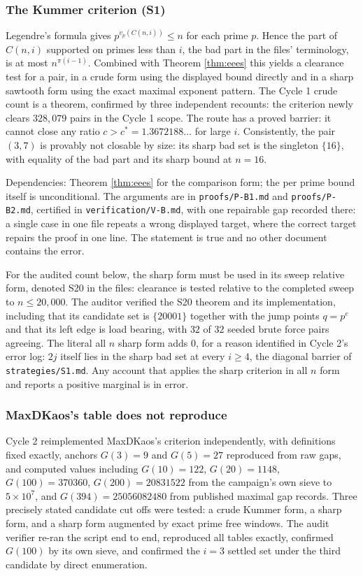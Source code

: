 \documentclass[11pt]{article}
\theoremstyle{remark}
\begin{document}
\subsubsection{The Kummer criterion (S1)}

Legendre's formula gives $p^{v_p(C(n,i))}\le n$ for each prime $p$. Hence the part of $C(n,i)$ supported on primes less than $i$, the bad part in the files' terminology, is at most $n^{\pi(i-1)}$. Combined with Theorem \ref{thm:eees} this yields a clearance test for a pair, in a crude form using the displayed bound directly and in a sharp sawtooth form using the exact maximal exponent pattern. The Cycle 1 crude count is a theorem, confirmed by three independent recounts: the criterion newly clears $328{,}079$ pairs in the Cycle 1 scope. The route has a proved barrier: it cannot close any ratio $c>c^*=1.3672188\dots$ for large $i$. Consistently, the pair $(3,7)$ is provably not closable by size: its sharp bad set is the singleton $\{16\}$, with equality of the bad part and its sharp bound at $n=16$.

Dependencies: Theorem \ref{thm:eees} for the comparison form; the per prime bound itself is unconditional. The arguments are in \texttt{proofs/P-B1.md} and \texttt{proofs/P-B2.md}, certified in \texttt{verification/V-B.md}, with one repairable gap recorded there: a single case in one file repeats a wrong displayed target, where the correct target repairs the proof in one line. The statement is true and no other document contains the error.

For the audited count below, the sharp form must be used in its sweep relative form, denoted S20 in the files: clearance is tested relative to the completed sweep to $n\le 20{,}000$. The auditor verified the S20 theorem and its implementation, including that its candidate set is $\{20001\}$ together with the jump points $q=p^e$ and that its left edge is load bearing, with $32$ of $32$ seeded brute force pairs agreeing. The literal all $n$ sharp form adds $0$, for a reason identified in Cycle 2's error log: $2j$ itself lies in the sharp bad set at every $i\ge 4$, the diagonal barrier of \texttt{strategies/S1.md}. Any account that applies the sharp criterion in all $n$ form and reports a positive marginal is in error.

\subsubsection{MaxDKaos's table does not reproduce}

Cycle 2 reimplemented MaxDKaos's criterion independently, with definitions fixed exactly, anchors $G(3)=9$ and $G(5)=27$ reproduced from raw gaps, and computed values including $G(10)=122$, $G(20)=1148$, $G(100)=370360$, $G(200)=20831522$ from the campaign's own sieve to $5\times 10^7$, and $G(394)=25056082480$ from published maximal gap records. Three precisely stated candidate cut offs were tested: a crude Kummer form, a sharp form, and a sharp form augmented by exact prime free windows. The audit verifier re-ran the script end to end, reproduced all tables exactly, confirmed $G(100)$ by its own sieve, and confirmed the $i=3$ settled set under the third candidate by direct enumeration.
\end{document}

